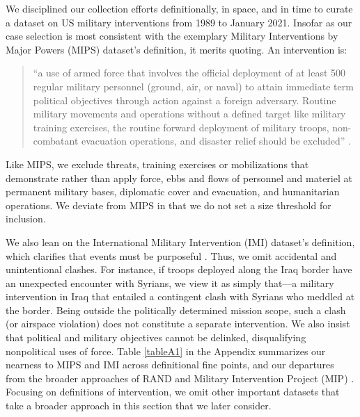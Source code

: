 \documentclass[fleqn,12pt]{article}
\begin{document}
We disciplined our collection efforts definitionally, in space, and in time to curate a dataset on US military interventions from 1989 to January 2021. Insofar as our case selection is most consistent with the exemplary Military Interventions by Major Powers (MIPS) dataset’s definition, it merits quoting. An intervention is: 

\begin{quote}\singlespacing
``a use of armed force that involves the official deployment of at least 500 regular military personnel (ground, air, or naval) to attain immediate term political objectives through action against a foreign adversary. Routine military movements and operations without a defined target like military training exercises, the routine forward deployment of military troops, non-combatant evacuation operations, and disaster relief should be excluded” \citep[][3]{SullivanKoch09}. 
\end{quote}

\noindent \doublespacing
Like MIPS, we exclude threats, training exercises or mobilizations that demonstrate rather than apply force, ebbs and flows of personnel and materiel at permanent military bases, diplomatic cover and evacuation, and humanitarian operations. We deviate from MIPS in that we do not set a size threshold for inclusion.

We also lean on the International Military Intervention (IMI) dataset’s definition, which clarifies that events must be purposeful \citep{PearsonBaumann93, KisanganiPickering08}. Thus, we omit accidental and unintentional clashes. For instance, if troops deployed along the Iraq border have an unexpected encounter with Syrians, we view it as simply that—a military intervention in Iraq that entailed a contingent clash with Syrians who meddled at the border. Being outside the politically determined mission scope, such a clash (or airspace violation) does not constitute a separate intervention. We also insist that political and military objectives cannot be delinked, disqualifying nonpolitical uses of force. Table \ref{tableA1} in the Appendix summarizes our nearness to MIPS and IMI across definitional fine points, and our departures from the broader approaches of RAND \citep{Kavanagh19} and Military Intervention Project (MIP) \citep{KushiDT22}. Focusing on definitions of intervention, we omit other important datasets that take a broader approach in this section that we later consider.
\end{document}
